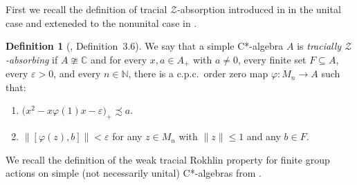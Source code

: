 \documentclass[11pt]{amsart}
\theoremstyle{plain}
\theoremstyle{definition}
\newtheorem{definition}[theorem]{Definition}
\theoremstyle{remark}
\numberwithin{equation}{section}
\begin{document}
First we recall 
the definition
of  tracial  $\mathcal{Z}$-absorption
introduced in  \cite{HO13} in the  unital case
and exteneded to the nonunital case in \cite{AGJP21}.



\begin{definition}[\cite{AGJP21}, Definition~3.6]\label{deftza}
	We say that a simple C*-algebra $A$
	is \emph{tracially $\mathcal{Z}$-absorbing} if
	$A \ncong \mathbb{C}$
	and for every $x, a \in A_{+}$ with $a \neq 0$,
	every finite set $F \subseteq A$, every $\varepsilon > 0$,
	and every $n \in \mathbb{N}$,
	there is a c.p.c.~order zero map $\varphi \colon M_{n} \to A$
	such that:
	\begin{enumerate}
		\item\label{deftza-it1}
		$\bigl( x^{2} - x \varphi (1) x - \varepsilon \bigr)_{+} \precsim a$.
		\item\label{deftza-it2}
		$\| [\varphi (z), b] \| < \varepsilon$
		for any $z \in M_{n}$ with $\| z \| \leq 1$ and any $b \in F$.
	\end{enumerate}
\end{definition}

We recall the definition of the
weak tracial Rokhlin property
for finite group actions on simple (not necessarily unital)
C*-algebras from \cite{FG17}.
\end{document}

